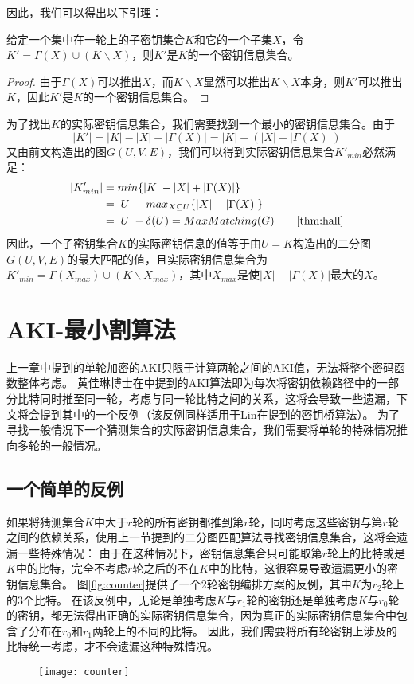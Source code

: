 因此，我们可以得出以下引理：
\begin{lem}
    给定一个集中在一轮上的子密钥集合$K$和它的一个子集$X$，令$K'=\Gamma(X)\cup(K\backslash X)$，则$K'$是$K$的一个密钥信息集合。
\end{lem}
\begin{proof}
    由于$\Gamma(X)$可以推出$X$，而$K\backslash X$显然可以推出$K\backslash X$本身，则$K'$可以推出$K$，因此$K'$是$K$的一个密钥信息集合。
\end{proof}
为了找出$K$的实际密钥信息集合，我们需要找到一个最小的密钥信息集合。由于
$$|K'|=|K|-|X|+|\Gamma(X)|=|K|-(|X|-|\Gamma(X)|)$$
又由前文构造出的图$G(U,V,E)$，我们可以得到实际密钥信息集合$K'_{min}$必然满足：
\[
\begin{split}
    |K'_{min}|&=min\{|K|-|X|+|\Gamma(X)|\}\\
              &=|U|-max_{X\subseteq U}\{|X|-|\Gamma(X)|\}\\
              &=|U|-\delta(U)=MaxMatching(G) \qquad\ref{thm:hall}
\end{split}
\]
因此，一个子密钥集合$K$的实际密钥信息的值等于由$U=K$构造出的二分图$G(U,V,E)$的最大匹配的值，且实际密钥信息集合为$K'_{min}=\Gamma(X_{max})\cup(K\backslash X_{max})$，其中$X_{max}$是使$|X|-|\Gamma(X)|$最大的$X$。

\section{AKI-最小割算法}
上一章中提到的单轮加密的AKI只限于计算两轮之间的AKI值，无法将整个密码函数整体考虑。
黄佳琳博士在中提到的AKI算法即为每次将密钥依赖路径中的一部分比特同时推至同一轮，考虑与同一轮比特之间的关系，这将会导致一些遗漏，下文将会提到其中的一个反例（该反例同样适用于Lin在提到的密钥桥算法）。
为了寻找一般情况下一个猜测集合的实际密钥信息集合，我们需要将单轮的特殊情况推向多轮的一般情况。
\subsection{一个简单的反例}
如果将猜测集合$K$中大于$r$轮的所有密钥都推到第$r$轮，同时考虑这些密钥与第$r$轮之间的依赖关系，使用上一节提到的二分图匹配算法寻找密钥信息集合，这将会遗漏一些特殊情况：
由于在这种情况下，密钥信息集合只可能取第$r$轮上的比特或是$K$中的比特，完全不考虑$r$轮之后的不在$K$中的比特，这很容易导致遗漏更小的密钥信息集合。
图\ref{fig:counter}提供了一个2轮密钥编排方案的反例，其中$K$为$r_2$轮上的3个比特。
在该反例中，无论是单独考虑$K$与$r_1$轮的密钥还是单独考虑$K$与$r_0$轮的密钥，都无法得出正确的实际密钥信息集合，因为真正的实际密钥信息集合中包含了分布在$r_0$和$r_1$两轮上的不同的比特。
因此，我们需要将所有轮密钥上涉及的比特统一考虑，才不会遗漏这种特殊情况。
\begin{figure}
    \centering
    \texttt{[image: counter]}
\end{figure}
